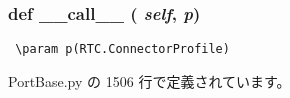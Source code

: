 \subsubsection{\setlength{\rightskip}{0pt plus 5cm}def \_\-\_\-call\_\-\_\- ( {\em self},  {\em p})}\label{classsource__py_1_1_port_base_1_1_port_base_1_1disconnect__all__func_e844e0019d38360a86bac1474132db3c}




\footnotesize\begin{verbatim}
 \param p(RTC.ConnectorProfile)
\end{verbatim}
\normalsize
 

 PortBase.py の 1506 行で定義されています。